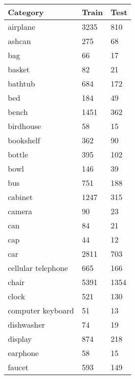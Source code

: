 \begin{table}[]
	\begin{tabular}[t]{lll}
		\hline
		\textbf{Category}  & \textbf{Train} & \textbf{Test} \\ \hline
		airplane           & 3235           & 810           \\
		ashcan             & 275            & 68            \\
		bag                & 66             & 17            \\
		basket             & 82             & 21            \\
		bathtub            & 684            & 172           \\
		bed                & 184            & 49            \\
		bench              & 1451           & 362           \\
		birdhouse          & 58             & 15            \\
		bookshelf          & 362            & 90            \\
		bottle             & 395            & 102           \\
		bowl               & 146            & 39            \\
		bus                & 751            & 188           \\
		cabinet            & 1247           & 315           \\
		camera             & 90             & 23            \\
		can                & 84             & 21            \\
		cap                & 44             & 12            \\
		car                & 2811           & 703           \\
		cellular telephone & 665            & 166           \\
		chair              & 5391           & 1354          \\
		clock              & 521            & 130           \\
		computer keyboard  & 51             & 13            \\
		dishwasher         & 74             & 19            \\
		display            & 874            & 218           \\
		earphone           & 58             & 15            \\
		faucet             & 593            & 149           \\

\end{tabular}
\end{table}
